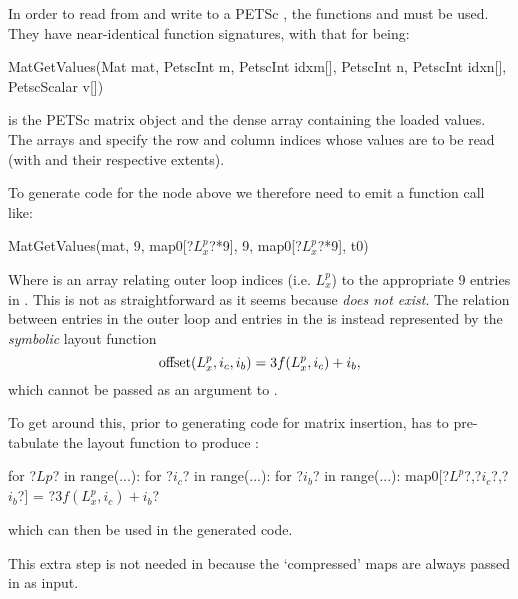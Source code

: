 \documentclass[thesis]{subfiles}
\begin{document}
In order to read from and write to a PETSc , the functions  and  must be used.
They have near-identical function signatures, with that for  being:
\begin{cinline}
  MatGetValues(Mat mat,
               PetscInt m, PetscInt idxm[],
               PetscInt n, PetscInt idxn[],
               PetscScalar v[])
\end{cinline}
 is the PETSc matrix object and  the dense array containing the loaded values\footnotemark.
The arrays  and  specify the row and column indices whose values are to be read (with  and  their respective extents).


To generate code for the  node above we therefore need to emit a function call like:
\begin{cinline}
  MatGetValues(mat, 9, map0[?$L^p_x$?*9], 9, map0[?$L^p_x$?*9], t0)
\end{cinline}
Where  is an array relating outer loop indices (i.e. $L^p_x$) to the appropriate 9 entries in .
This is not as straightforward as it seems because  \emph{does not exist}.
The relation between entries in the outer loop and entries in the  is instead represented by the \emph{symbolic} layout function
\begin{equation}
  \textnormal{offset}(L^p_x,i_c,i_b) = 3 f(L^p_x,i_c) + i_b,
\end{equation}
which cannot be passed as an argument to .

To get around this, prior to generating code for matrix insertion,  has to pre-tabulate the layout function to produce :
\begin{pyinline}
  for ?$Lp$? in range(...):
    for ?$i_c$? in range(...):
      for ?$i_b$? in range(...):
        map0[?$L^p$?,?$i_c$?,?$i_b$?] = ?$3 f(L^p_x,i_c) + i_b$?
\end{pyinline}
which can then be used in the generated code.

This extra step is not needed in  because the `compressed' maps are always passed in as input.
\end{document}
